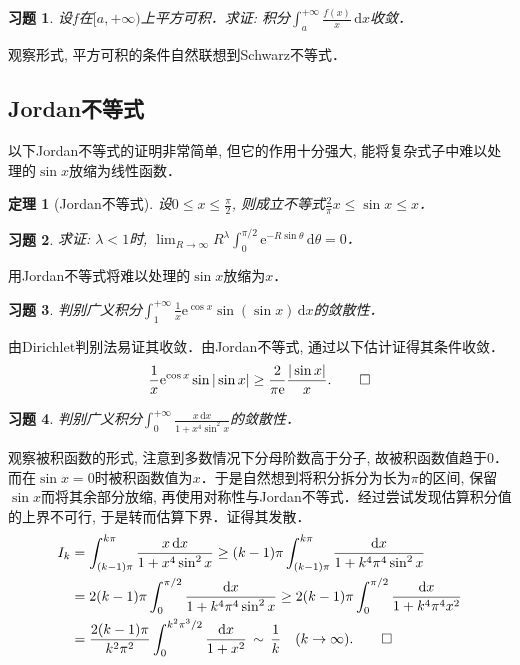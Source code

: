 \documentclass[11pt,a4paper]{ctexart}
\makeatletter
\theoremstyle{thmseries} %
\newtheorem{thm}{定理}[section]
\theoremstyle{exerseries}
\newtheorem{exer}{习题}[section]
\renewenvironment{proof}[1][\proofname]{\par
  \pushQED{\qed}%
  \normalfont \topsep6\p@\@plus6\p@\relax
  \trivlist
  \item[\hskip\labelsep
        \itshape
    #1\@addpunct{}]\ignorespaces
}{%
  \popQED\endtrivlist\@endpefalse
}
\newenvironment{sol}{\begin{proof}[\bfseries\upshape 解\quad]}{\end{proof}}
\newenvironment{pf}{\begin{proof}[\bfseries\upshape 证\quad]}{\end{proof}}
\renewcommand{\d}{\mathrm{d}}
\newcommand{\e}{\mathrm{e}}
\makeatother
\begin{document}
\begin{exer}
	设$f$在$[a,+\infty)$上平方可积．求证: 积分$\int_{a}^{+\infty}\frac{f(x)}{x}\,\d x$收敛．
\end{exer}
\begin{pf}
	观察形式, 平方可积的条件自然联想到Schwarz不等式．
\end{pf}


\subsection{Jordan不等式}
以下Jordan不等式的证明非常简单, 但它的作用十分强大, 能将复杂式子中难以处理的$\sin x$放缩为线性函数．
\begin{thm}[Jordan不等式]
	设$0\leq x\leq\frac{\pi}{2}$, 则成立不等式$\frac{2}{\pi}x\leq\sin x\leq x$．
\end{thm}

\begin{exer}
	求证: $\lambda<1$时, $\lim_{R\to\infty}R^\lambda\int_{0}^{\pi/2}\e^{-R\sin\theta}\,\d\theta=0$．
\end{exer}
\begin{pf}
	用Jordan不等式将难以处理的$\sin x$放缩为$x$．
\end{pf}

\begin{exer}
	判别广义积分$\int_{1}^{+\infty}\frac{1}{x}\e^{\cos x}\sin(\sin x)\,\d x$的敛散性．
\end{exer}
\begin{sol}
	由Dirichlet判别法易证其收敛．由Jordan不等式, 通过以下估计证得其条件收敛．
	\[\frac{1}{x}\e^{\cos x}\sin|\sin x|\geq\frac{2}{\pi\e}\frac{|\sin x|}{x}.\qedhere\]
\end{sol}

\begin{exer}
	判别广义积分$\int_{0}^{+\infty}\frac{x\,\d x}{1+x^4\sin^2x}$的敛散性．
\end{exer}
\begin{sol}
	观察被积函数的形式, 注意到多数情况下分母阶数高于分子, 故被积函数值趋于$0$．而在$\sin x=0$时被积函数值为$x$．于是自然想到将积分拆分为长为$\pi$的区间, 保留$\sin x$而将其余部分放缩, 再使用对称性与Jordan不等式．经过尝试发现估算积分值的上界不可行, 于是转而估算下界．证得其发散．
	\begin{align*}
		I_k&=\int_{(k-1)\pi}^{k\pi}\frac{x\,\d x}{1+x^4\sin^2x}\geq(k-1)\pi\int_{(k-1)\pi}^{k\pi}\frac{\d x}{1+k^4\pi^4\sin^2x}\\
		&=2(k-1)\pi\int_{0}^{\pi/2}\frac{\d x}{1+k^4\pi^4\sin^2x}\geq2(k-1)\pi\int_{0}^{\pi/2}\frac{\d x}{1+k^4\pi^4x^2}\\
		&=\frac{2(k-1)\pi}{k^2\pi^2}\int_{0}^{k^2\pi^3/2}\frac{\d x}{1+x^2}\,\sim\,\frac{1}{k}\quad(k\to\infty).\qedhere
	\end{align*}
\end{sol}
\end{document}
